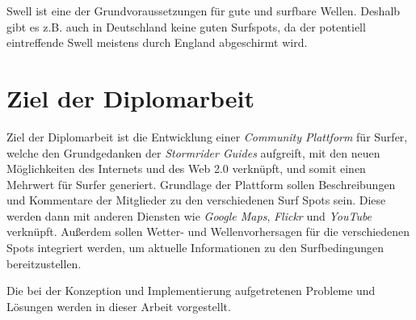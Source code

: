Swell ist eine der Grundvoraussetzungen für gute und surfbare
Wellen. Deshalb gibt es z.B. auch in Deutschland keine guten
Surfspots, da der potentiell eintreffende Swell meistens durch England
abgeschirmt wird.

\section{Ziel der Diplomarbeit}

Ziel der Diplomarbeit ist die Entwicklung einer \textit{Community
  Plattform} für Surfer, welche den Grundgedanken der
\textit{Stormrider Guides} aufgreift, mit den neuen Möglichkeiten des
Internets und des Web 2.0 verknüpft, und somit einen Mehrwert für
Surfer generiert. Grundlage der Plattform sollen Beschreibungen und
Kommentare der Mitglieder zu den verschiedenen Surf Spots sein. Diese
werden dann mit anderen Diensten wie \textit{Google Maps},
\textit{Flickr} und \textit{YouTube} verknüpft. Außerdem sollen
Wetter- und Wellenvorhersagen für die verschiedenen Spots integriert
werden, um aktuelle Informationen zu den Surfbedingungen
bereitzustellen.

Die bei der Konzeption und Implementierung aufgetretenen Probleme und
Lösungen werden in dieser Arbeit vorgestellt.


% 

